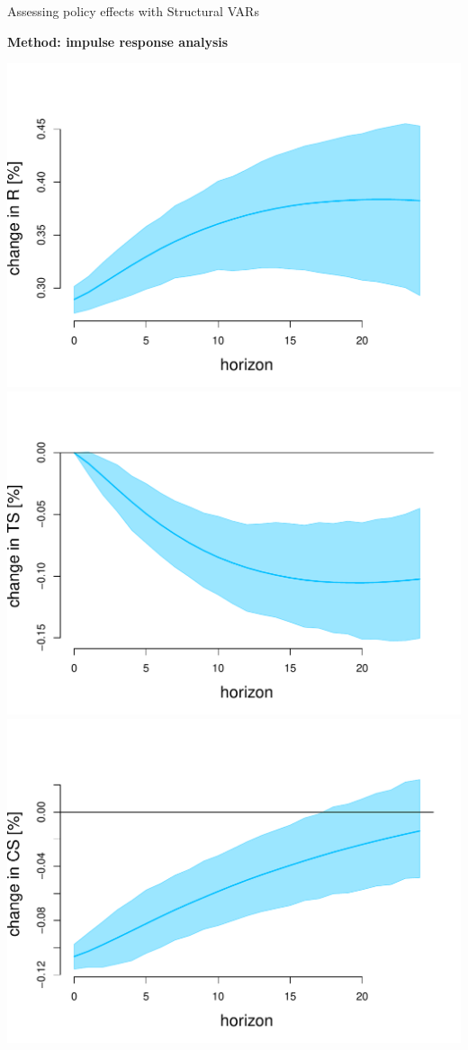 \documentclass[notes,blackandwhite,mathsans]{beamer}
\begin{document}
\begin{frame}{Assessing policy effects with Structural VARs}

\textbf{Method: impulse response analysis}

\includegraphics[scale=0.3]{grphs/06irf-33}
\includegraphics[scale=0.3]{grphs/06irf-43}
\includegraphics[scale=0.3]{grphs/06irf-63}

\end{frame}
\end{document}
